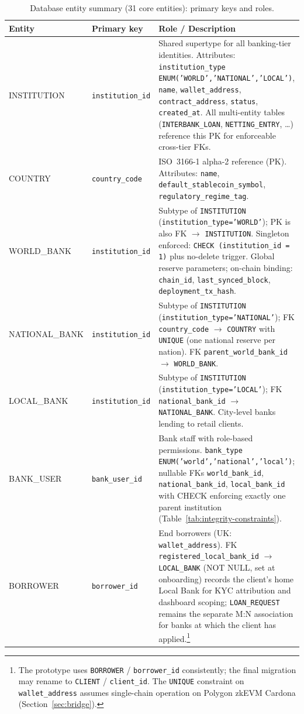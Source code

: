 \documentclass[12pt,a4paper]{report}
\newcommand{\tableheadcolor}{\rowcolor{TableHeadBg}}
\begin{document}
\begin{table}[H]
\centering
\caption[Database entity summary (31 core entities)]{Database entity summary (31 core entities): primary keys and roles.}
\label{tab:db-entities}
\small
\begin{tabular}{@{}p{2.6cm}p{3.4cm}p{7.0cm}@{}}
\toprule
\tableheadcolor
\textbf{Entity} & \textbf{Primary key} & \textbf{Role / Description} \\
\midrule
INSTITUTION & \texttt{institution\_id} & Shared supertype for all banking-tier identities. Attributes: \texttt{institution\_type} \texttt{ENUM('WORLD','NATIONAL','LOCAL')}, \texttt{name}, \texttt{wallet\_address}, \texttt{contract\_address}, \texttt{status}, \texttt{created\_at}. All multi-entity tables (\texttt{INTERBANK\_LOAN}, \texttt{NETTING\_ENTRY}, \ldots) reference this PK for enforceable cross-tier FKs. \\
COUNTRY & \texttt{country\_code} & ISO~3166-1 alpha-2 reference (PK). Attributes: \texttt{name}, \texttt{default\_stablecoin\_symbol}, \texttt{regulatory\_regime\_tag}. \\
WORLD\_BANK & \texttt{institution\_id} & Subtype of \texttt{INSTITUTION} (\texttt{institution\_type='WORLD'}); PK is also FK $\to$ \texttt{INSTITUTION}. Singleton enforced: \texttt{CHECK (institution\_id = 1)} plus no-delete trigger. Global reserve parameters; on-chain binding: \texttt{chain\_id}, \texttt{last\_synced\_block}, \texttt{deployment\_tx\_hash}. \\
NATIONAL\_BANK & \texttt{institution\_id} & Subtype of \texttt{INSTITUTION} (\texttt{institution\_type='NATIONAL'}); FK \texttt{country\_code} $\to$ \texttt{COUNTRY} with \texttt{UNIQUE} (one national reserve per nation). FK \texttt{parent\_world\_bank\_id} $\to$ \texttt{WORLD\_BANK}. \\
LOCAL\_BANK & \texttt{institution\_id} & Subtype of \texttt{INSTITUTION} (\texttt{institution\_type='LOCAL'}); FK \texttt{national\_bank\_id} $\to$ \texttt{NATIONAL\_BANK}. City-level banks lending to retail clients. \\
BANK\_USER & \texttt{bank\_user\_id} & Bank staff with role-based permissions. \texttt{bank\_type} \texttt{ENUM('world','national','local')}; nullable FKs \texttt{world\_bank\_id}, \texttt{national\_bank\_id}, \texttt{local\_bank\_id} with CHECK enforcing exactly one parent institution (Table~\ref{tab:integrity-constraints}). \\
BORROWER & \texttt{borrower\_id} & End borrowers (UK: \texttt{wallet\_address}). FK \texttt{registered\_local\_bank\_id} $\to$ \texttt{LOCAL\_BANK} (NOT NULL, set at onboarding) records the client's home Local Bank for KYC attribution and dashboard scoping; \texttt{LOAN\_REQUEST} remains the separate M:N association for banks at which the client has applied.\footnote{The prototype uses \texttt{BORROWER} / \texttt{borrower\_id} consistently; the final migration may rename to \texttt{CLIENT} / \texttt{client\_id}. The \texttt{UNIQUE} constraint on \texttt{wallet\_address} assumes single-chain operation on Polygon zkEVM Cardona (Section~\ref{sec:bridge}).} \\

\end{tabular}
\end{table}
\end{document}
